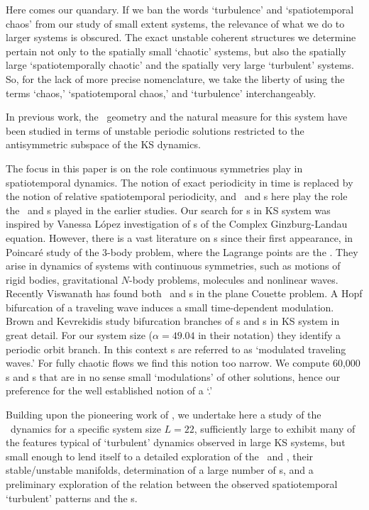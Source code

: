 {
Here comes our quandary. If we ban the words `turbulence' and
`spatiotemporal chaos' from our study of small extent
systems, the relevance of what we do to larger systems is
obscured. The exact unstable coherent structures we determine
pertain not only to the spatially small `chaotic' systems,
but also the spatially large `spatiotemporally chaotic' and
the spatially very large `turbulent' systems.
So, for the lack of more precise nomenclature, we take the
liberty of using the terms `chaos,' `spatiotemporal chaos,'
and `turbulence' interchangeably.
} %


In previous work, the \statesp\ geometry and the natural measure for
this system have been
studied in terms of unstable
periodic solutions restricted to the antisymmetric subspace of the
KS dynamics.

The focus in this paper is on the role continuous symmetries
play in spatiotemporal dynamics. The notion of exact
periodicity in time is replaced by the notion of relative
spatiotemporal periodicity, and \reqva\ and \rpo s here play
the role the \eqva\ and \po s played in the earlier studies.
Our search for \rpo s in KS system was inspired by Vanessa
L{\'o}pez investigation of {\rpo s} of the
Complex Ginzburg-Landau equation.  However, there is a vast
literature on {\rpo s} since their first appearance, in
Poincar\'e study of the 3-body problem,
where the Lagrange points are the \reqva.  They arise in
dynamics of systems with continuous symmetries, such as
motions of rigid bodies, gravitational $N$-body problems,
molecules and nonlinear waves. Recently Viswanath
has found both \reqva\ and \rpo s in
the plane Couette problem.
    {
A Hopf bifurcation of a traveling
wave induces a small
time-dependent modulation. Brown and Kevrekidis
study bifurcation branches of \po s and \rpo s in KS system
in great detail. For our system size ($\alpha=49.04$ in their
notation) they identify a periodic orbit branch. In this
context \rpo s are referred to as `modulated traveling
waves.' For fully chaotic flows we find this notion too
narrow. We compute 60,000 \po s and \rpo s that are in no
sense small `modulations' of other solutions, hence our
preference for the well established notion of a `\rpo.'
          }

Building upon the pioneering work of
, we undertake here a
study of the \KS\ dynamics for a specific system size $L =
22$, sufficiently large to exhibit many of the features
typical of `turbulent' dynamics observed in large KS systems,
but small enough to lend itself to a detailed exploration of
the  \eqva\ and \reqva, their stable/unstable manifolds,
determination of a large number of \rpo s, and a preliminary
exploration of the relation between the observed
spatiotemporal `turbulent' patterns and the \rpo s.

